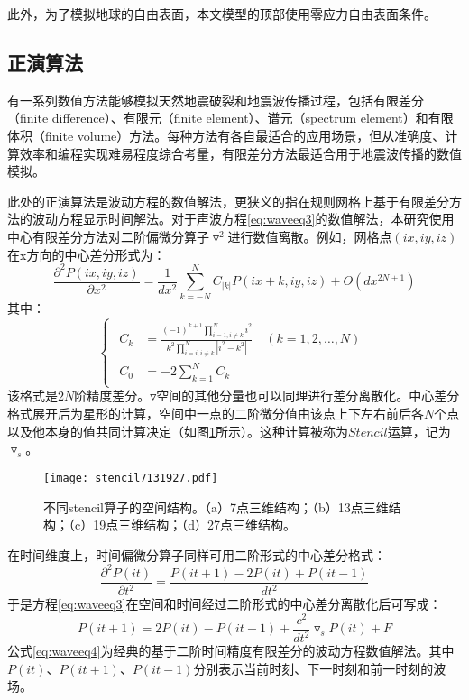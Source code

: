此外，为了模拟地球的自由表面，本文模型的顶部使用零应力自由表面条件\cite{gottschammer2001accuracy}。

\subsection{正演算法} %
有一系列数值方法能够模拟天然地震破裂和地震波传播过程，包括有限差分（finite difference）、有限元（finite element）、谱元（spectrum element）和有限体积（finite volume）方法。每种方法有各自最适合的应用场景，但从准确度、计算效率和编程实现难易程度综合考量，有限差分方法最适合用于地震波传播的数值模拟。

此处的正演算法是波动方程的数值解法，更狭义的指在规则网格上基于有限差分方法的波动方程显示时间解法。对于声波方程\ref{eq:waveeq3}的数值解法，本研究使用中心有限差分方法对二阶偏微分算子$\triangledown ^2$进行数值离散。例如，网格点$(ix, iy, iz)$在x方向的中心差分形式为：
\begin{equation}
  \frac{\partial ^2 P(ix, iy, iz)}{\partial x^2}=\frac{1}{dx^2}\sum_{k=-N}^N C_{|k|}P(ix+k, iy, iz)+O(dx^{2N+1})
\end{equation}
其中：
\begin{equation}
\left\{\begin{matrix}
\begin{aligned}
C_k &=\frac{(-1)^{k+1}\prod_{i=1,i\neq k}^N i^2}{k^2\prod_{i=i,i\neq k}^N |i^2-k^2|}\quad (k=1,2,\ldots,N) \\
C_0 &=-2\sum_{k=1}^N C_k  
\end{aligned}
\end{matrix}\right.
\end{equation}
该格式是$2N$阶精度差分。$\triangledown$空间的其他分量也可以同理进行差分离散化。中心差分格式展开后为星形的计算，空间中一点的二阶微分值由该点上下左右前后各$N$个点以及他本身的值共同计算决定（如图\ref{fig:stencilstruct}所示）。这种计算被称为$Stencil$运算，记为$\triangledown_s$。

\begin{figure}[ht]
  \centering
  \texttt{[image: stencil7131927.pdf]}
  \caption{不同stencil算子的空间结构\cite{zhang2013autogeneration}。（a）7点三维结构；（b）13点三维结构；（c）19点三维结构；（d）27点三维结构。}
  \label{fig:stencilstruct}
\end{figure}

在时间维度上，时间偏微分算子同样可用二阶形式的中心差分格式：
\begin{equation}
  \frac{\partial ^2 P(it)}{\partial t^2}=\frac{P(it+1)-2P(it)+P(it-1)}{dt^2}
\end{equation}
于是方程\ref{eq:waveeq3}在空间和时间经过二阶形式的中心差分离散化后可写成：
\begin{equation}
  P(it+1)=2P(it)-P(it-1)+\frac{c^2}{dt^2}\triangledown_s P(it)+F
  \label{eq:waveeq4}
\end{equation}
公式\ref{eq:waveeq4}为经典的基于二阶时间精度有限差分的波动方程数值解法。其中$P(it)$、$P(it+1)、$$P(it-1)$分别表示当前时刻、下一时刻和前一时刻的波场。

